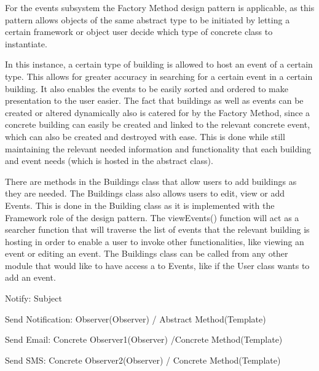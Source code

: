 \documentclass{article}
\begin{document}
    \begin{flushleft}
    
        For the events subsystem the Factory Method design pattern is applicable, as this pattern allows objects of the same abstract type to be initiated by letting a certain framework or object user decide which type of concrete class to instantiate.
        
        \bigskip
        
        In this instance, a certain type of building is allowed to host an event of a certain type. This allows for greater accuracy in searching for a certain event in a certain building. It also enables the events to be easily sorted and ordered to make presentation to the user easier. The fact that buildings as well as events can be created or altered dynamically also is catered for by the Factory Method, since a concrete building can easily be created and linked to the relevant concrete event, which can also be created and destroyed with ease. This is done while still maintaining the relevant needed information and functionality that each building and event needs (which is hosted in the abstract class).
        
        \bigskip
        
        There are methods in the Buildings class that allow users to add buildings as they are needed. The Buildings class also allows users to edit, view or add Events. This is done in the Building class as it is implemented with the Framework role of the design pattern. The viewEvents() function will act as a searcher function that will traverse the list of events that the relevant building is hosting in order to enable a user to invoke other functionalities, like  viewing an event or editing an event. The Buildings class can be called from any other module that would like to have access a to Events, like if the User class wants to add an event.
        
        \bigskip
        Notify: Subject
        
        Send Notification: Observer(Observer) / Abstract Method(Template)
        
        Send Email: Concrete Observer1(Observer) /Concrete Method(Template)
        
        Send SMS: Concrete Observer2(Observer) / Concrete Method(Template)
    
    \end{flushleft}
    
    \mbox{}\\
    \bigskip
    \clearpage
    
\end{document}
